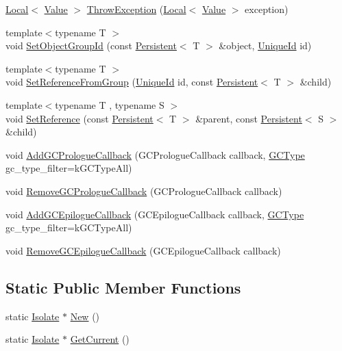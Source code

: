 \begin{DoxyCompactItemize}
\item 
\hyperlink{classv8_1_1_local}{Local}$<$ \hyperlink{classv8_1_1_value}{Value} $>$ \hyperlink{classv8_1_1_isolate_aba648b3c00dc9f1ef2a22195d99e22e8}{Throw\+Exception} (\hyperlink{classv8_1_1_local}{Local}$<$ \hyperlink{classv8_1_1_value}{Value} $>$ exception)
\item 
{\footnotesize template$<$typename T $>$ }\\void \hyperlink{classv8_1_1_isolate_ae4418cb238686a321aa406e90c72fab5}{Set\+Object\+Group\+Id} (const \hyperlink{classv8_1_1_persistent}{Persistent}$<$ T $>$ \&object, \hyperlink{classv8_1_1_unique_id}{Unique\+Id} id)
\item 
{\footnotesize template$<$typename T $>$ }\\void \hyperlink{classv8_1_1_isolate_a0f8484db111e967d70ea7551b3593ce6}{Set\+Reference\+From\+Group} (\hyperlink{classv8_1_1_unique_id}{Unique\+Id} id, const \hyperlink{classv8_1_1_persistent}{Persistent}$<$ T $>$ \&child)
\item 
{\footnotesize template$<$typename T , typename S $>$ }\\void \hyperlink{classv8_1_1_isolate_a055fc73d18747b96c51f00599cdd3ec1}{Set\+Reference} (const \hyperlink{classv8_1_1_persistent}{Persistent}$<$ T $>$ \&parent, const \hyperlink{classv8_1_1_persistent}{Persistent}$<$ S $>$ \&child)
\item 
void \hyperlink{classv8_1_1_isolate_ac5614f2eae055c949927bc8daddf90c3}{Add\+G\+C\+Prologue\+Callback} (G\+C\+Prologue\+Callback callback, \hyperlink{namespacev8_ac109d6f27e0c0f9ef4e98bcf7a806cf2}{G\+C\+Type} gc\+\_\+type\+\_\+filter=k\+G\+C\+Type\+All)
\item 
void \hyperlink{classv8_1_1_isolate_a7902b8b58f3c85bac9b7dd1086fa81ce}{Remove\+G\+C\+Prologue\+Callback} (G\+C\+Prologue\+Callback callback)
\item 
void \hyperlink{classv8_1_1_isolate_add9cac1ffd6cb1b7ed6b0956cebae129}{Add\+G\+C\+Epilogue\+Callback} (G\+C\+Epilogue\+Callback callback, \hyperlink{namespacev8_ac109d6f27e0c0f9ef4e98bcf7a806cf2}{G\+C\+Type} gc\+\_\+type\+\_\+filter=k\+G\+C\+Type\+All)
\item 
void \hyperlink{classv8_1_1_isolate_a277144482f5fefd58d822c22a173b01a}{Remove\+G\+C\+Epilogue\+Callback} (G\+C\+Epilogue\+Callback callback)
\end{DoxyCompactItemize}
\subsection*{Static Public Member Functions}
\begin{DoxyCompactItemize}
\item 
static \hyperlink{classv8_1_1_isolate}{Isolate} $\ast$ \hyperlink{classv8_1_1_isolate_a36f397e1d09e0122e89641288f348d2d}{New} ()
\item 
static \hyperlink{classv8_1_1_isolate}{Isolate} $\ast$ \hyperlink{classv8_1_1_isolate_aa79441b5da4438221d0f38790c4de2ed}{Get\+Current} ()
\end{DoxyCompactItemize}


